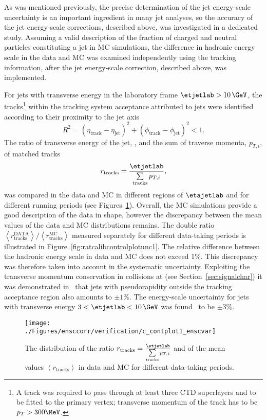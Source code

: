As  was mentioned previously, the precise determination of the jet energy-scale uncertainty is an important ingredient in many jet analyses, so the accuracy of the jet energy-scale corrections, described above, was investigated in a dedicated study. Assuming a valid description of the fraction of charged and neutral particles constituting a jet in MC simulations, the difference in hadronic energy scale in the data and MC was examined independently using the tracking information, after the jet energy-scale correction, described above, was implemented. 

For jets with transverse energy in the laboratory frame $\etjetlab > 10\,\GeV$, the tracks\footnote{A track was required to pass through at least three CTD superlayers and to be fitted to the primary vertex; transverse momentum of the track has to be $p_T > 300 \MeV$.} within the tracking system acceptance attributed to jets were identified according to their proximity to the jet axis
\begin{equation}
R^2 = \left(\eta_{\mathrm{track}} - \eta_{\mathrm{jet}}\right)^2 + \left(\phi_{\mathrm{track}} - \phi_{\mathrm{jet}}\right)^2 < 1.
\label{eq:rtrackjetcut}
\end{equation}
The ratio of transverse energy of the jet, \etjetlab, and the sum of traverse momenta, $p_{T,i}$, of matched tracks 
\begin{equation}
r_\text{tracks} = \frac{\etjetlab}{\sum\limits_{\text{tracks}}{p_{T,i}}},
\end{equation}
was compared in the data and MC in different regions of $\etajetlab$ and for different running periods (see Figures~\ref{fig:ratcalibcontrolplotunc}). Overall, the MC simulations provide a good description of the data in shape, however the discrepancy between the mean values of the data and MC distributions remains. The double ratio $\left<r_\text{tracks}^\text{DATA}\right>/\left<r_\text{tracks}^\text{MC}\right>$ measured separately for different data-taking periods is illustrated in Figure~\ref{fig:ratcalibcontrolplotunc1}. The relative difference between the hadronic energy scale in data and MC does not exceed 1\%. This discrepancy was therefore taken into account in the systematic uncertainty. Exploiting the transverse momentum conservation in \ep collisions at \hera (see Section~\ref{sec:signalchar}) it was demonstrated in~\cite{thesis:behr:2010,thesis:perrey:2011} that jets with pseudorapidity outside the tracking acceptance region also amounts to $\pm 1\%$. The energy-scale uncertainty for jets with transverse energy $3<\etjetlab<10\,\GeV$ was found~\cite{thesis:behr:2010} to be $\pm 3\%$.
\begin{figure}[h!]
	\centering
		\texttt{[image: ./Figures/ensccorr/verification/c\_contplot1\_enscvar]} 
	\caption{The distribution of the ratio $r_\text{tracks} = \frac{\etjetlab}{\sum\limits_{\text{tracks}}{p_{T,i}}}$ and of the mean values $\left\langle r_\text{tracks}\right\rangle$ in data and MC for different data-taking periods.}
	\label{fig:ratcalibcontrolplotunc}
\end{figure}


